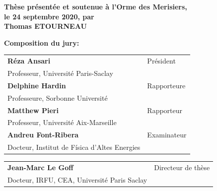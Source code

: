 \begin{titlepage}
\textbf{Thèse présentée et soutenue à l'Orme des Merisiers, }\\
\textbf{le 24 septembre 2020, par} \\
\bigskip
\Large {\color{Prune} \textbf{Thomas ETOURNEAU}}


\vspace{\fill} %

\flushleft \small \textbf{Composition du jury:}
\bigskip



\scriptsize
\begin{tabular}{|p{8cm}l}
\arrayrulecolor{Prune}
\textbf{Réza Ansari} &   Président\\ 
Professeur, Université Paris-Saclay & \\
\textbf{Delphine Hardin} &  Rapporteure \\ 
Professeure, Sorbonne Université   &   \\ 
\textbf{Matthew Pieri} &  Rapporteur \\ 
Professeur, Université Aix-Marseille  &   \\ 
\textbf{Andreu Font-Ribera} &  Examinateur \\ 
Docteur, Institut de Física d’Altes Energies   &   \\ 

\end{tabular} 

\medskip
\begin{tabular}{|p{8cm}l}\arrayrulecolor{white}
  \textbf{Jean-Marc Le Goff} &  Directeur de thèse \\ 
  Docteur, IRFU, CEA, Université Paris Saclay   &   \\ 


\end{tabular} 


\end{titlepage}
